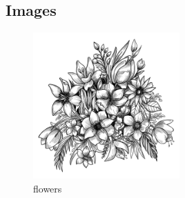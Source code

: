 \documentclass{article}
\begin{document}
	\subsection{Images}
	\begin{figure}[ht]
		\centering
		\includegraphics[width=0.5\textwidth]{rb_20368.png}
		\caption{flowers}
		\label{flowres}
	\end{figure}
\end{document}
